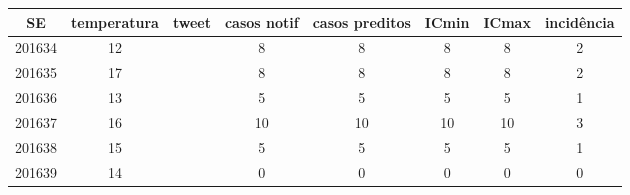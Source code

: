 \begin{tabular}{c|ccccccc}
  \hline
SE & temperatura & tweet & casos notif & casos preditos & ICmin & ICmax & incidência \\ 
  \hline
201634 & 12 &  & 8 & 8 & 8 & 8 & 2 \\ 
  201635 & 17 &  & 8 & 8 & 8 & 8 & 2 \\ 
  201636 & 13 &  & 5 & 5 & 5 & 5 & 1 \\ 
  201637 & 16 &  & 10 & 10 & 10 & 10 & 3 \\ 
  201638 & 15 &  & 5 & 5 & 5 & 5 & 1 \\ 
  201639 & 14 &  & 0 & 0 & 0 & 0 & 0 \\ 
   \hline
\end{tabular}
